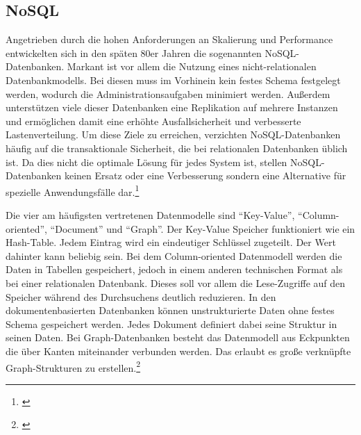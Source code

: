 
\subsection{NoSQL}


Angetrieben durch die hohen Anforderungen an Skalierung und Performance entwickelten sich in den späten 80er Jahren die sogenannten NoSQL-Datenbanken. Markant ist vor allem die Nutzung eines nicht-relationalen Datenbankmodells. Bei diesen muss im Vorhinein kein festes Schema festgelegt werden, wodurch die Administrationsaufgaben minimiert werden. Außerdem unterstützen viele dieser Datenbanken eine Replikation auf mehrere Instanzen und ermöglichen damit eine erhöhte Ausfallsicherheit und verbesserte Lastenverteilung. Um diese Ziele zu erreichen, verzichten NoSQL-Datenbanken häufig auf die transaktionale Sicherheit, die bei relationalen Datenbanken üblich ist. Da dies nicht die optimale Lösung für jedes System ist, stellen NoSQL-Datenbanken keinen Ersatz oder eine Verbesserung sondern eine Alternative für spezielle Anwendungsfälle dar.\footnote{\cite[Vgl.][51\psq]{Bagga2021}}

Die vier am häufigsten vertretenen Datenmodelle sind \enquote{Key-Value}, \enquote{Column-oriented}, \enquote{Document} und \enquote{Graph}. Der Key-Value Speicher funktioniert wie ein Hash-Table. Jedem Eintrag wird ein eindeutiger Schlüssel zugeteilt. Der Wert dahinter kann beliebig sein. Bei dem Column-oriented Datenmodell werden die Daten in Tabellen gespeichert, jedoch in einem anderen technischen Format als bei einer relationalen Datenbank. Dieses soll vor allem die Lese-Zugriffe auf den Speicher während des Durchsuchens deutlich reduzieren. In den dokumentenbasierten Datenbanken können unstrukturierte Daten ohne festes Schema gespeichert werden. Jedes Dokument definiert dabei seine Struktur in seinen Daten. Bei Graph-Datenbanken besteht das Datenmodell aus Eckpunkten die über Kanten miteinander verbunden werden. Das erlaubt es große verknüpfte Graph-Strukturen zu erstellen.\footnote{\cite[Vgl.][52\psq]{Bagga2021}}


